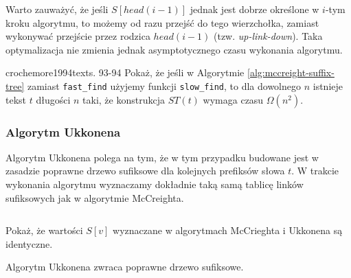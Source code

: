 Warto zauważyć, że jeśli $S[head(i - 1)]$ jednak jest dobrze określone w $i$-tym kroku algorytmu, to możemy od razu przejść do tego wierzchołka, zamiast wykonywać przejście przez rodzica $head(i - 1)$ (tzw. \emph{up-link-down}). Taka optymalizacja nie zmienia jednak asymptotycznego czasu wykonania algorytmu.

\begin{problem}{crochemore1994text}{s. 93-94}
  Pokaż, że jeśli w Algorytmie \ref{alg:mccreight-suffix-tree} zamiast \texttt{fast\_find} użyjemy funkcji \texttt{slow\_find}, to dla dowolnego $n$ istnieje tekst $t$ długości $n$ taki, że konstrukcja $ST(t)$ wymaga czasu $\Omega(n^2)$.
\end{problem}


\subsubsection{Algorytm Ukkonena}

Algorytm Ukkonena polega na tym, że w tym przypadku budowane jest w zasadzie poprawne drzewo sufiksowe dla kolejnych prefiksów słowa $t$.
W trakcie wykonania algorytmu wyznaczamy dokładnie taką samą tablicę linków sufiksowych jak w algorytmie McCreighta.

\begin{code}
\inputminted{python}{code/suffix-tree/ukkonen.py}
\label{alg:ukkonen-suffix-tree}
\end{code}

\begin{problem}{}{}
  Pokaż, że wartości $S[v]$ wyznaczane w algorytmach McCrieghta i Ukkonena są identyczne.
\end{problem}

\begin{theorem}{}{}
  Algorytm Ukkonena zwraca poprawne drzewo sufiksowe.
\end{theorem}

